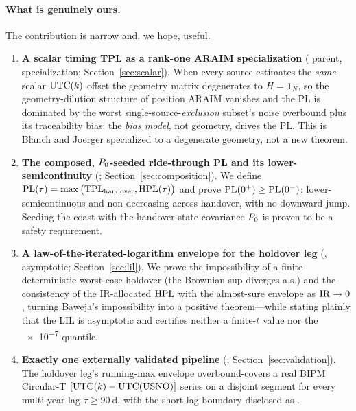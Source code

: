 \paragraph{What is genuinely ours.}
The contribution is narrow and, we hope, useful.
\begin{enumerate}
  \item \textbf{A scalar timing TPL as a rank-one ARAIM specialization}
  (\Cited{} parent, \Proven{} specialization; Section~\ref{sec:scalar}). When
  every source estimates the \emph{same} scalar $\mathrm{UTC}(k){}$ offset the geometry
  matrix degenerates to $H=\bm 1_N$, so the geometry-dilution structure of
  position ARAIM vanishes and the PL is dominated by the worst
  single-source-\emph{exclusion} subset's noise overbound plus its traceability
  bias: the \emph{bias model}, not geometry, drives the PL. This is Blanch and
  Joerger specialized to a degenerate geometry, not a new theorem.
  \item \textbf{The composed, $P_0$-seeded ride-through PL and its
  lower-semicontinuity} (\Proven{}; Section~\ref{sec:composition}). We define
  $\mathrm{PL}(\tau)=\max\big(\mathrm{TPL}_{\mathrm{handover}},\mathrm{HPL}(\tau)\big)$ and prove
  $\mathrm{PL}(0^{+})\ge\mathrm{PL}(0^{-})$: lower-semicontinuous and non-decreasing across
  handover, with no downward jump. Seeding the coast with the handover-state
  covariance $P_0$ is proven to be a safety requirement.
  \item \textbf{A law-of-the-iterated-logarithm envelope for the holdover leg}
  (\Proven{}, asymptotic; Section~\ref{sec:lil}). We prove the impossibility of a
  finite deterministic worst-case holdover (the Brownian sup diverges a.s.) and
  the consistency of the IR-allocated $\mathrm{HPL}$ with the almost-sure envelope as
  $\mathrm{IR}\to0$, turning Baweja's impossibility into a positive theorem---while
  stating plainly that the LIL is asymptotic and certifies neither a finite-$t$
  value nor the \num{e-7} quantile.
  \item \textbf{Exactly one externally validated pipeline} (\Validated{};
  Section~\ref{sec:validation}). The holdover leg's running-max envelope
  overbound-covers a real BIPM Circular-T $[\mathrm{UTC}(k){}-\mathrm{UTC(USNO)}]$ series on
  a disjoint segment for every multi-year lag $\tau\ge\SI{90}{\day}$, with the
  short-lag boundary disclosed as \Modelled{}.
\end{enumerate}

